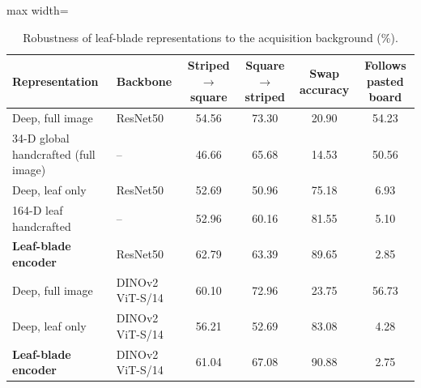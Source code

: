 \begin{table}[tbp]
\centering
\footnotesize
\caption{Robustness of leaf-blade representations to the acquisition background (\%).}
\label{tab:robust}
\begin{adjustbox}{max width=\textwidth}
\begin{tabular}{llcccc}
\toprule
Representation & Backbone & Striped$\rightarrow$square & Square$\rightarrow$striped & Swap accuracy & Follows pasted board \\
\midrule
Deep, full image & ResNet50 & 54.56 & 73.30 & 20.90 & 54.23 \\
34-D global handcrafted (full image) & -- & 46.66 & 65.68 & 14.53 & 50.56 \\
Deep, leaf only & ResNet50 & 52.69 & 50.96 & 75.18 & 6.93 \\
164-D leaf handcrafted & -- & 52.96 & 60.16 & 81.55 & 5.10 \\
\textbf{Leaf-blade encoder} & ResNet50 & 62.79 & 63.39 & 89.65 & 2.85 \\
\midrule
Deep, full image & DINOv2 ViT-S/14 & 60.10 & 72.96 & 23.75 & 56.73 \\
Deep, leaf only & DINOv2 ViT-S/14 & 56.21 & 52.69 & 83.08 & 4.28 \\
\textbf{Leaf-blade encoder} & DINOv2 ViT-S/14 & 61.04 & 67.08 & 90.88 & 2.75 \\
\bottomrule
\end{tabular}
\end{adjustbox}
\end{table}
